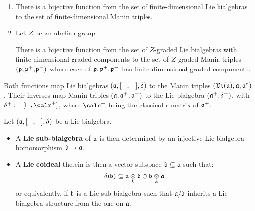         \begin{lemma} \label{lemma: lie_bialgebras_from_manin_triples}
            \begin{enumerate}
                \item \cite[Proposition 1.3.4 and Lemma 1.3.5]{chari_pressley_quantum_groups} There is a bijective function from the set of finite-dimensional Lie bialgebras to the set of finite-dimensional Manin triples.
                \item Let $Z$ be an abelian group. 

                There is a bijective function from the set of $Z$-graded Lie bialgebras with finite-dimensional graded components to the set of $Z$-graded Manin triples $(\mathfrak{p}, \mathfrak{p}^+, \mathfrak{p}^-)$ where each of $\mathfrak{p}, \mathfrak{p}^+, \mathfrak{p}^-$ has finite-dimensional graded components.
            \end{enumerate}
            Both functions map Lie bialgebras $(\mathfrak{a}, [-, -], \delta)$ to the Manin triples $(\mathfrak{Dr}(\mathfrak{a}), \mathfrak{a}, \mathfrak{a}^*)$. Their inverses map Manin triples $(\mathfrak{a}, \mathfrak{a}^+, \mathfrak{a}^-)$ to the Lie bialgebra $(\mathfrak{a}^+, \delta^+)$, with $\delta^+ := [\Box, \calr^+]$, where $\calr^+$ being the classical r-matrix of $\mathfrak{a}^+$.
        \end{lemma}
        
        \begin{definition} \label{def: lie_sub_bialgebras_and_lie_coideals}
            Let $(\mathfrak{a}, [-, -], \delta)$ be a Lie bialgebra.
            \begin{itemize}
                \item A \textbf{Lie sub-bialgebra} of $\mathfrak{a}$ is then determined by an injective Lie bialgebra homomorphism $\mathfrak{b} \to \mathfrak{a}$. 
                \item A \textbf{Lie coideal} therein is then a vector subspace $\mathfrak{b} \subseteq \mathfrak{a}$ such that:
                    $$\delta(\b) \subseteq \a \tensor_k \b \oplus \b \tensor_k \a$$
                or equivalently, if $\mathfrak{b}$ is a Lie sub-bialgebra such that $\mathfrak{a}/\mathfrak{b}$ inherits a Lie bialgebra structure from the one on $\mathfrak{a}$.
            \end{itemize}
        \end{definition}
    
